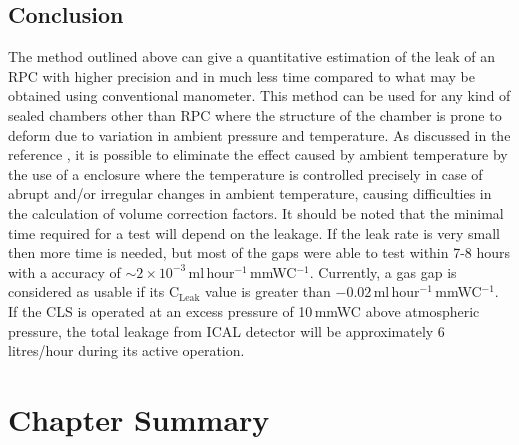 \subsection{Conclusion}
The method outlined above can give a quantitative estimation of the leak of an RPC with higher precision and in much less time compared to what may be obtained using conventional manometer. This method can be used for any kind of sealed chambers other than RPC where the structure of the chamber is prone to deform due to variation in ambient pressure and temperature. As discussed in the reference \cite{Mondal_2016}, it is possible to eliminate the effect caused by ambient temperature by the use of a enclosure where the temperature is controlled precisely in case of abrupt and/or irregular changes in ambient temperature, causing difficulties in the calculation of volume correction factors. It should be noted that the minimal time required for a test will depend on the leakage. If the leak rate is very small then more time is needed, but most of the gaps were able to test within 7-8 hours with a accuracy of $\sim 2\times 10^{-3}$\,ml\,hour$^{-1}$\,mmWC$^{-1}$. Currently, a gas gap is considered as usable if its $\textrm{C}_{\textrm{Leak}}$ value is greater than $-0.02$\,ml\,hour$^{-1}$\,mmWC$^{-1}$. If the CLS is operated at an excess pressure of 10\,mmWC above atmospheric pressure, the total leakage from ICAL detector will be approximately 6\,litres/hour during its active operation.

\section{Chapter Summary}
